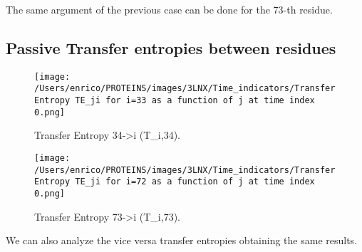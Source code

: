 \documentclass[English, Lau, oneside]{sapthesis}
\begin{document}
The same argument of the previous case can be done for the 73-th residue.\\
\newpage
\subsection{Passive Transfer entropies between residues }

\begin{figure}[h!]
    \centering
    \texttt{[image: /Users/enrico/PROTEINS/images/3LNX/Time\_indicators/Transfer Entropy TE\_ji for i=33 as a function of j at time index 0.png]}
    \caption{Transfer Entropy 34->i (T_{i,34}).}
    \label{fig:TE34_pass}
\end{figure}

\begin{figure}[h!]
    \centering
    \texttt{[image: /Users/enrico/PROTEINS/images/3LNX/Time\_indicators/Transfer Entropy TE\_ji for i=72 as a function of j at time index 0.png]}
    \caption{Transfer Entropy 73->i (T_{i,73}).}
    \label{fig:TE73_pass}
\end{figure}

We can also analyze the vice versa transfer entropies obtaining the same results.\\



\newpage
\newpage

\newpage
\end{document}
